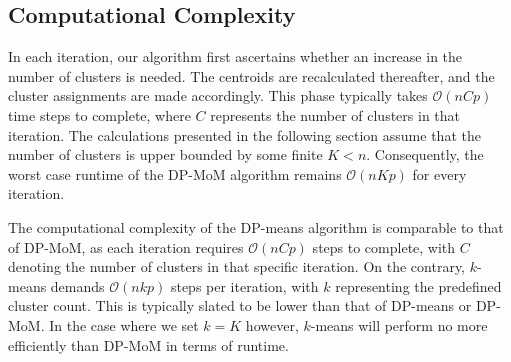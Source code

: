 \documentclass[12pt]{article}
\begin{document}

\subsection{Computational Complexity}
In each iteration, our algorithm first ascertains whether an increase in the number of clusters is needed. The centroids are recalculated thereafter, and the cluster assignments are made accordingly. This phase typically takes $\mathcal{O}(nCp)$ time steps to complete, where $C$ represents the number of clusters in that iteration. The calculations presented in the following section assume that the number of clusters is upper bounded by some finite $K<n$. Consequently, the worst case runtime of the DP-MoM algorithm remains $\mathcal{O}(nKp)$ for every iteration.

The computational complexity of the DP-means algorithm is comparable to that of DP-MoM, as each iteration requires $\mathcal{O}(nCp)$ steps to complete, with $C$ denoting the number of clusters in that specific iteration. On the contrary, $k$-means demands $\mathcal{O}(nkp)$ steps per iteration, with $k$ representing the predefined cluster count. This is typically slated to be lower than that of DP-means or DP-MoM. In the case where we set $k=K$ however, $k$-means will perform no more efficiently than DP-MoM in terms of runtime.
\end{document}
